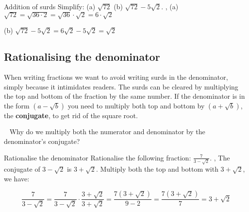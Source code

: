 \begin{example}{Addition of surds}
Simplify:
(a) $\sqrt{72}$ \hspace{1cm}
(b) $\sqrt{72}-5\sqrt{2}$.
\sep
(a) $\sqrt{72}=\sqrt{36 \cdot 2}=\sqrt{36} \cdot \sqrt{2}=6 \cdot \sqrt{2}$

(b) $\sqrt{72}-5\sqrt{2}=6\sqrt{2}-5\sqrt{2}=\sqrt{2}$
\end{example}

\subsection{Rationalising the denominator}
When writing fractions we want to avoid writing surds in the denominator, simply because it intimidates readers. The surds can be cleared by multiplying the top and bottom of the fraction by the same number. If the denominator is in the form $(a-\sqrt{b})$ you need to multiply both top and bottom by $(a+\sqrt{b})$, the \textbf{conjugate}, to get rid of the square root. %
\begin{thinking}{~}
Why do we multiply both the numerator and denominator by the denominator's conjugate?
\end{thinking}
\begin{example}{Rationalise the denominator}
Rationalise the following fraction: $\frac{7}{3-\sqrt{2}}$.
\sep
The conjugate of $3-\sqrt{2}$ is $3+\sqrt{2}$.
Multiply both the top and bottom with $3+\sqrt{2}$, we have:

\[ \frac{7}{3-\sqrt{2}}=\frac{7}{3-\sqrt{2}} \cdot \frac{3+\sqrt{2}}{3+\sqrt{2}}=\frac{7\left(3+\sqrt{2}\right)}{9-2}=\frac{7\left(3+\sqrt{2}\right)}{7}=3+\sqrt{2} \]
\end{example}

